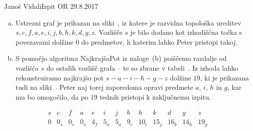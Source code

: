\begin{naloga}{Janoš Vidali}{Izpit OR 29.8.2017}
\begin{odgovor}
\begin{enumerate}[(a)]
\item Ustrezni graf je prikazan na sliki~\fig,
iz katere je razvidna topološka ureditev
$s, c, f, a, e, i, j, b, h, k, d, g, z$.
Vozlišče $s$ je bilo dodano kot izhodiščna točka
s povezavami dolžine $0$ do predmetov,
h katerim lahko Peter pristopi takoj.

\item S pomočjo algoritma {\sc NajkrajšaPot} iz naloge~\res[topo]{}(b)
poiščemo razdalje od vozlišča $s$ do ostalih vozlišč grafa
-- te so zbrane v tabeli~.
Iz izhoda lahko rekonstruiramo
najkrajšo pot $s - a - i - h - g - z$ dolžine $19$,
ki je prikazana tudi na sliki~\fig.
Peter naj torej zaporedoma opravi predmete $a$, $i$, $h$ in $g$,
kar mu bo omogočilo, da po $19$ tednih pristopi k zaključnemu izpitu.
\end{enumerate}
%
\begin{slika}
\makebox[\textwidth][c]{
\pgfslika
}
\end{slika}

\begin{tabela}
$$
\begin{array}{ccccccccccccc}
s & c & f & a & e & i & j & b & h & k & d & g & z \\ \hline
0 & 0_s & 0_s & 0_s & 4_f & 5_a & 5_a & 9_c & 10_i & 15_j & 16_b & 14_h & 19_g
\end{array}
$$
\end{tabela}
\end{odgovor}
\end{naloga}
